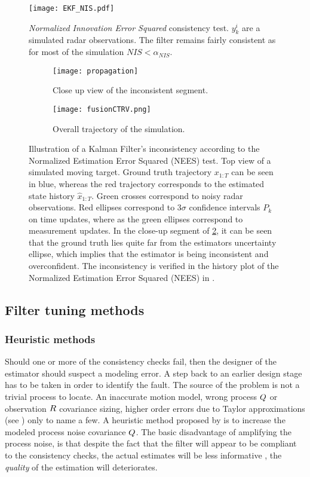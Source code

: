 \begin{figure}[H]
	\centering
	\texttt{[image: EKF\_NIS.pdf]}
	\caption{\emph{Normalized Innovation Error Squared} consistency test. $y^i_k$ are a simulated radar observations. The filter remains fairly consistent as for most of the simulation $NIS < \alpha_{NIS}$.}
	\label{fig:ekfNIS}
\end{figure}

\begin{figure}[H]
	\begin{subfigure}[b]{.8\textwidth}
		\centering
		\texttt{[image: propagation]}
		\caption{Close up view of the inconsistent segment.}
		\label{fig:KFinconsistent1}
	\end{subfigure}\hfill
	\begin{subfigure}[b]{.8\textwidth}
		\centering
		\texttt{[image: fusionCTRV.png]}
		\caption{Overall trajectory of the simulation.}
		\label{fig:KFinconsistent2}
	\end{subfigure}
	\captionsetup{font=small}
	\caption{Illustration of a Kalman Filter's inconsistency according to the Normalized Estimation Error Squared (NEES) test. Top view of a simulated moving target. Ground truth trajectory $x_{1:T}$ can be seen in blue,  whereas the red trajectory corresponds to the estimated state history $\hat{x}_{1:T}$. Green crosses correspond to noisy radar observations. Red ellipses correspond to $3\sigma$ confidence intervals $P_k$ on time updates, where as the green ellipses correspond to measurement updates. In the close-up segment of \cref{fig:KFinconsistent1}, it can be seen that the ground truth lies quite far from the estimators uncertainty ellipse, which implies that the estimator is being inconsistent and overconfident. The inconsistency is verified in the history plot of the Normalized Estimation Error Squared (NEES) in .}
	\label{fig:KFinconsistent}
\end{figure}

\subsection{Filter tuning methods}
\subsubsection{Heuristic methods}
Should one or more of the consistency checks fail, then the designer of the estimator should suspect a modeling error. A step back to an earlier design stage has to be taken in order to identify the fault. The source of the problem is not a trivial process to locate. An inaccurate motion model, wrong process ${Q}$ or observation ${R}$ covariance sizing, higher order errors due to Taylor approximations (see ) only to name a few. A heuristic method proposed by \cite{BarShalom1980} is to increase the modeled process noise covariance ${Q}$. The basic disadvantage of amplifying the process noise, is that despite the fact that the filter will appear to be compliant to the consistency checks, the actual estimates will be less informative \ie, the \emph{quality} of the estimation will deteriorates.

